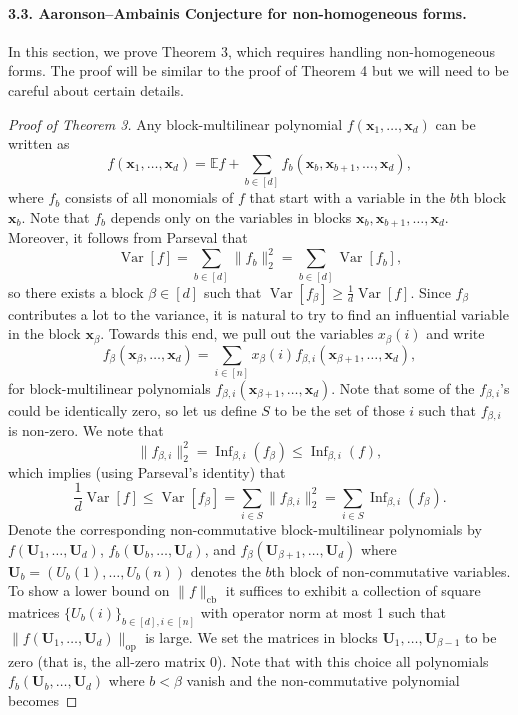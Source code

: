 \paragraph{3.3. Aaronson--Ambainis Conjecture for non-homogeneous forms.}
In this section, we prove Theorem 3, which requires handling non-homogeneous forms. The proof will be similar to the proof of Theorem 4 but we will need to be careful about certain details.
\begin{proof}[Proof of Theorem 3]
Any block-multilinear polynomial $f(\mathbf x_1,\ldots,\mathbf x_d)$ can be written as
\[f(\mathbf x_1,\ldots,\mathbf x_d)=\mathbb Ef+\sum_{b\in[d]}f_b(\mathbf x_b,\mathbf x_{b+1},\ldots,\mathbf x_d),\]
where $f_b$ consists of all monomials of $f$ that start with a variable in the $b$th block $\mathbf x_b$. Note that $f_b$ depends only on the variables in blocks $\mathbf x_b,\mathbf x_{b+1},\ldots,\mathbf x_d$. Moreover, it follows from Parseval that
\[\operatorname{Var}[f]=\sum_{b\in[d]}\|f_b\|_2^2=\sum_{b\in[d]}\operatorname{Var}[f_b],\tag{9}\]
so there exists a block $\beta\in[d]$ such that $\operatorname{Var}[f_\beta]\geq\frac1d\operatorname{Var}[f]$.
Since $f_\beta$ contributes a lot to the variance, it is natural to try to find an influential variable in the block $\mathbf x_\beta$. Towards this end, we pull out the variables $x_\beta(i)$ and write
\[f_\beta(\mathbf x_\beta,\ldots,\mathbf x_d)=\sum_{i\in[n]}x_\beta(i)f_{\beta,i}(\mathbf x_{\beta+1},\ldots,\mathbf x_d),\]
for block-multilinear polynomials $f_{\beta,i}(\mathbf x_{\beta+1},\ldots,\mathbf x_d)$. Note that some of the $f_{\beta,i}$'s could be identically zero, so let us define $S$ to be the set of those $i$ such that $f_{\beta,i}$ is non-zero. We note that
\[\|f_{\beta,i}\|_2^2=\operatorname{Inf}_{\beta,i}(f_\beta)\leq\operatorname{Inf}_{\beta,i}(f),\tag{10}\]
which implies (using Parseval's identity) that
\[\frac1d\operatorname{Var}[f]\leq\operatorname{Var}[f_\beta]=\sum_{i\in S}\|f_{\beta,i}\|_2^2=\sum_{i\in S}\operatorname{Inf}_{\beta,i}(f_\beta).\tag{11}\]
Denote the corresponding non-commutative block-multilinear polynomials by $f(\mathbf U_1,\ldots,\mathbf U_d)$, $f_b(\mathbf U_b,\ldots,\mathbf U_d)$, and $f_\beta(\mathbf U_{\beta+1},\ldots,\mathbf U_d)$ where $\mathbf U_b=(U_b(1),\ldots,U_b(n))$ denotes the $b$th block of non-commutative variables. To show a lower bound on $\|f\|_{\mathrm{cb}}$ it suffices to exhibit a collection of square matrices $\{U_b(i)\}_{b\in[d],i\in[n]}$ with operator norm at most 1 such that $\|f(\mathbf U_1,\ldots,\mathbf U_d)\|_{\mathrm{op}}$ is large.
We set the matrices in blocks $\mathbf U_1,\ldots,\mathbf U_{\beta-1}$ to be zero (that is, the all-zero matrix $0$). Note that with this choice all polynomials $f_b(\mathbf U_b,\ldots,\mathbf U_d)$ where $b<\beta$ vanish and the non-commutative polynomial becomes

\end{proof}
